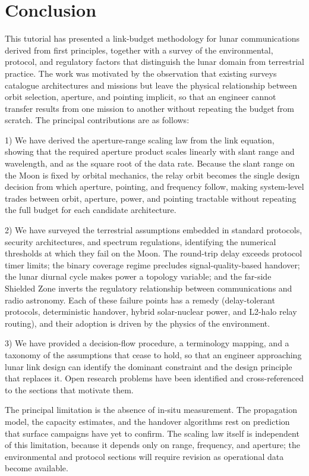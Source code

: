 \documentclass[11pt,a4paper]{article}
\begin{document}
\section{Conclusion}
\label{sec:conclusion}

This tutorial has presented a link-budget methodology for lunar communications derived from first principles, together with a survey of the environmental, protocol, and regulatory factors that distinguish the lunar domain from terrestrial practice. The work was motivated by the observation that existing surveys catalogue architectures and missions but leave the physical relationship between orbit selection, aperture, and pointing implicit, so that an engineer cannot transfer results from one mission to another without repeating the budget from scratch. The principal contributions are as follows:

1) We have derived the aperture-range scaling law from the link equation, showing that the required aperture product scales linearly with slant range and wavelength, and as the square root of the data rate. Because the slant range on the Moon is fixed by orbital mechanics, the relay orbit becomes the single design decision from which aperture, pointing, and frequency follow, making system-level trades between orbit, aperture, power, and pointing tractable without repeating the full budget for each candidate architecture.

2) We have surveyed the terrestrial assumptions embedded in standard protocols, security architectures, and spectrum regulations, identifying the numerical thresholds at which they fail on the Moon. The round-trip delay exceeds protocol timer limits; the binary coverage regime precludes signal-quality-based handover; the lunar diurnal cycle makes power a topology variable; and the far-side Shielded Zone inverts the regulatory relationship between communications and radio astronomy. Each of these failure points has a remedy (delay-tolerant protocols, deterministic handover, hybrid solar-nuclear power, and L2-halo relay routing), and their adoption is driven by the physics of the environment.

3) We have provided a decision-flow procedure, a terminology mapping, and a taxonomy of the assumptions that cease to hold, so that an engineer approaching lunar link design can identify the dominant constraint and the design principle that replaces it. Open research problems have been identified and cross-referenced to the sections that motivate them.

The principal limitation is the absence of in-situ measurement. The propagation model, the capacity estimates, and the handover algorithms rest on prediction that surface campaigns have yet to confirm. The scaling law itself is independent of this limitation, because it depends only on range, frequency, and aperture; the environmental and protocol sections will require revision as operational data become available.
\end{document}
